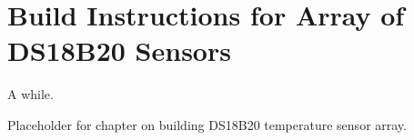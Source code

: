 %
  \setchapterpreamble[u]{\margintoc}
  \chapter{Build Instructions for Array of DS18B20 Sensors}
  \begin{kaobox}
    [backgroundcolor=\SNcolor,frametitlebackgroundcolor=\SNcolor,frametitle=Estimated build time] A while.
  \end{kaobox}
  Placeholder for chapter on building DS18B20 temperature sensor array.
%
